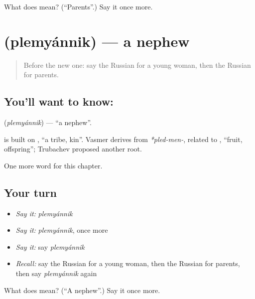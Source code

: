 \begin{tcolorbox}[breakable,colback=teal!4,colframe=teal!35!black,title={Before you move on}]
What does  mean? (\textquotedblleft{}Parents\textquotedblright{}.) Say it once more.
\end{tcolorbox}
\section[\texorpdfstring{\ru{племянник} (plemyánnik)}{племянник (plemyánnik)}]{ (plemyánnik) — a nephew}

\label{lesson:RU-C254-plemyannik}



\begin{quote}
Before the new one: say the Russian for a young woman, then the Russian for parents.
\end{quote}

\subsection*{You'll want to know: }
\textbf{} (\emph{plemyánnik}) — \textquotedblleft{}a nephew\textquotedblright{}.

\begin{cousinweb}
\textbf{} is built on \emph{}, \textquotedblleft{}a tribe, kin\textquotedblright{}. Vasmer derives \emph{} from \emph{*pled-men-}, related to \emph{}, \textquotedblleft{}fruit, offspring\textquotedblright{}; Trubachev proposed another root.
\end{cousinweb}

\begin{grammarlens}[title={What you've built}]
One more word for this chapter.
\end{grammarlens}

\subsection*{Your turn}
\begin{itemize}
\raggedright
  \item \emph{Say it:} \emph{plemyánnik}
  \item \emph{Say it:} \emph{plemyánnik}, once more
  \item \emph{Say it:} say \emph{plemyánnik}
  \item \emph{Recall:} say the Russian for a young woman, then the Russian for parents, then say \emph{plemyánnik} again
\end{itemize}

\begin{tcolorbox}[breakable,colback=teal!4,colframe=teal!35!black,title={Before you move on}]
What does  mean? (\textquotedblleft{}A nephew\textquotedblright{}.) Say it once more.
\end{tcolorbox}
